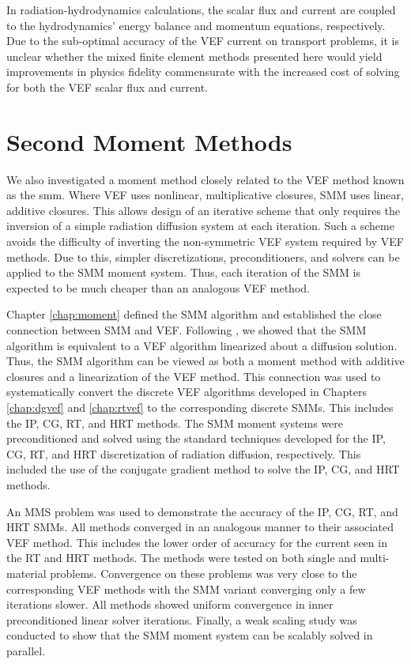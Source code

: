 \documentclass[../doc.tex]{subfiles}
\begin{document}
In radiation-hydrodynamics calculations, the scalar flux and current are coupled to the hydrodynamics' energy balance and momentum equations, respectively. 
Due to the sub-optimal accuracy of the VEF current on transport problems, it is unclear whether the mixed finite element methods presented here would yield improvements in physics fidelity commensurate with the increased cost of solving for both the VEF scalar flux and current. 

\section{Second Moment Methods}
We also investigated a moment method closely related to the VEF method known as the \gls{smm}. Where VEF uses nonlinear, multiplicative closures, SMM uses linear, additive closures. This allows design of an iterative scheme that only requires the inversion of a simple radiation diffusion system at each iteration. Such a scheme avoids the difficulty of inverting the non-symmetric VEF system required by VEF methods. Due to this, simpler discretizations, preconditioners, and solvers can be applied to the SMM moment system. Thus, each iteration of the SMM is expected to be much cheaper than an analogous VEF method. 

Chapter \ref{chap:moment} defined the SMM algorithm and established the close connection between SMM and VEF. Following \textcite{cefus}, we showed that the SMM algorithm is equivalent to a VEF algorithm linearized about a diffusion solution. Thus, the SMM algorithm can be viewed as both a moment method with additive closures and a linearization of the VEF method. This connection was used to systematically convert the discrete VEF algorithms developed in Chapters \ref{chap:dgvef} and \ref{chap:rtvef} to the corresponding discrete SMMs. This includes the IP, CG, RT, and HRT methods. The SMM moment systems were preconditioned and solved using the standard techniques developed for the IP, CG, RT, and HRT discretization of radiation diffusion, respectively. This included the use of the conjugate gradient method to solve the IP, CG, and HRT methods. 

An MMS problem was used to demonstrate the accuracy of the IP, CG, RT, and HRT SMMs. All methods converged in an analogous manner to their associated VEF method. This includes the lower order of accuracy for the current seen in the RT and HRT methods. The methods were tested on both single and multi-material problems. Convergence on these problems was very close to the corresponding VEF methods with the SMM variant converging only a few iterations slower. All methods showed uniform convergence in inner preconditioned linear solver iterations. Finally, a weak scaling study was conducted to show that the SMM moment system can be scalably solved in parallel. 
\end{document}
